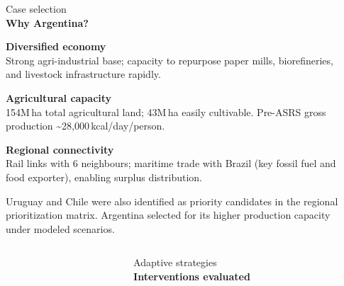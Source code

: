 \documentclass[final]{beamer}
\newlength{\sepwidth}
\newlength{\colwidth}
\newlength{\fullwidth}           %
\newenvironment{labelblock}[2]{%
  \begin{block}{%
      {\small\color{structure.fg!70!bg}#1}%
      \\[2pt]                                  %
      {\large\bfseries#2}%
      }%
      }{%
  \end{block}%
  }
\newcommand{\separatorcolumn}{\begin{column}{\sepwidth}\end{column}}
\begin{document}
\begin{frame}[t]
\begin{columns}[t]
\begin{column}{\colwidth}
\begin{labelblock}{Case selection}{Why Argentina?}
\begin{minipage}[t]{0.48\linewidth}
          {\footnotesize\bfseries\textcolor{tealdark}{Diversified economy}}\\
          {\scriptsize Strong agri-industrial base; capacity to repurpose paper mills, biorefineries,
          and livestock infrastructure rapidly.}
        \end{minipage}\hfill
        \begin{minipage}[t]{0.48\linewidth}
          \raggedright
          {\footnotesize\bfseries\textcolor{tealdark}{Agricultural capacity}}\\
          {\scriptsize 154M\,ha total agricultural land; 43M\,ha easily cultivable. Pre-ASRS gross
          production {\textasciitilde}28,000\,kcal/day/person.}
          \vspace{5pt}

          {\footnotesize\bfseries\textcolor{tealdark}{Regional connectivity}}\\
          {\scriptsize Rail links with 6 neighbours; maritime trade with Brazil (key fossil fuel and
          food exporter), enabling surplus distribution.}
        \end{minipage}

        \vspace{6pt}
        {\small Uruguay and Chile were also identified as priority candidates in the regional
        prioritization matrix. Argentina selected for its higher production capacity under modeled
        scenarios.}
      \end{labelblock}
    \end{column}

    \separatorcolumn
  \end{columns}

  \vspace{0.5cm}

  \begin{columns}[t]
    \separatorcolumn
    \begin{column}{\fullwidth}
      \begin{labelblock}{Adaptive strategies}{Interventions evaluated}


\end{labelblock}
\end{column}
\end{columns}
\end{frame}
\end{document}
